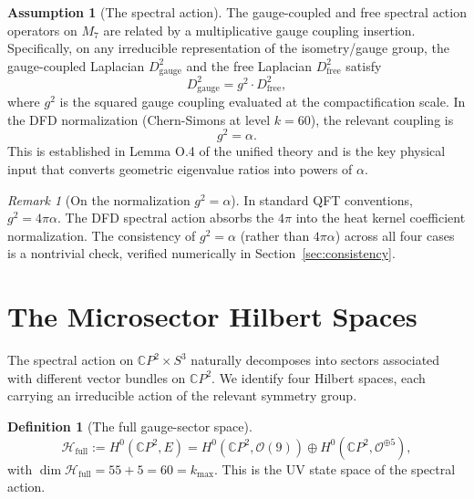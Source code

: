 \documentclass[11pt]{article}
\theoremstyle{definition}
\newtheorem{definition}[theorem]{Definition}
\newtheorem{assumption}[theorem]{Assumption}
\theoremstyle{remark}
\newtheorem*{remark}{Remark}
\newcommand{\CP}{\mathbb{C}P}
\begin{document}
\begin{assumption}[The spectral action]
\label{ass:spectral}
The gauge-coupled and free spectral action operators on $M_7$ are related
by a multiplicative gauge coupling insertion. Specifically, on any
irreducible representation of the isometry/gauge group, the
gauge-coupled Laplacian $D^2_{\mathrm{gauge}}$ and the free Laplacian
$D^2_{\mathrm{free}}$ satisfy
\begin{equation}
\label{eq:gauge-coupling}
D^2_{\mathrm{gauge}} = g^2 \cdot D^2_{\mathrm{free}},
\end{equation}
where $g^2$ is the squared gauge coupling evaluated at the
compactification scale. In the DFD normalization (Chern-Simons at
level $k = 60$), the relevant coupling is
\begin{equation}
\label{eq:g2-alpha}
g^2 = \alpha.
\end{equation}
This is established in Lemma O.4 of the unified theory and is the key
physical input that converts geometric eigenvalue ratios into powers of
$\alpha$.
\end{assumption}

\begin{remark}[On the normalization $g^2 = \alpha$]
\label{rem:normalization}
In standard QFT conventions, $g^2 = 4\pi\alpha$. The DFD spectral action
absorbs the $4\pi$ into the heat kernel coefficient normalization. The
consistency of $g^2 = \alpha$ (rather than $4\pi\alpha$) across all four
cases is a nontrivial check, verified numerically in
Section~\ref{sec:consistency}.
\end{remark}


\section{The Microsector Hilbert Spaces}
\label{sec:hilbert}

The spectral action on $\CP^2 \times S^3$ naturally decomposes into
sectors associated with different vector bundles on $\CP^2$. We identify
four Hilbert spaces, each carrying an irreducible action of the relevant
symmetry group.

\begin{definition}[The full gauge-sector space]
\label{def:H-full}
\begin{equation}
\mathcal{H}_{\mathrm{full}} := H^0(\CP^2, E) = H^0(\CP^2, \mathcal{O}(9))
\oplus H^0(\CP^2, \mathcal{O}^{\oplus 5}),
\end{equation}
with $\dim \mathcal{H}_{\mathrm{full}} = 55 + 5 = 60 = k_{\max}$.
This is the UV state space of the spectral action.
\end{definition}
\end{document}

